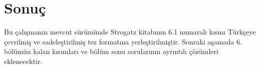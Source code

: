 \chapter*{Sonuç}
{}

\begin{justify}
Bu çalışmanın mevcut sürümünde Strogatz kitabının 6.1 numaralı kısmı Türkçeye çevrilmiş ve sadeleştirilmiş tez formatına yerleştirilmiştir. Sonraki aşamada 6. bölümün kalan kısımları ve bölüm sonu sorularının ayrıntılı çözümleri eklenecektir.
\end{justify}

\newpage
